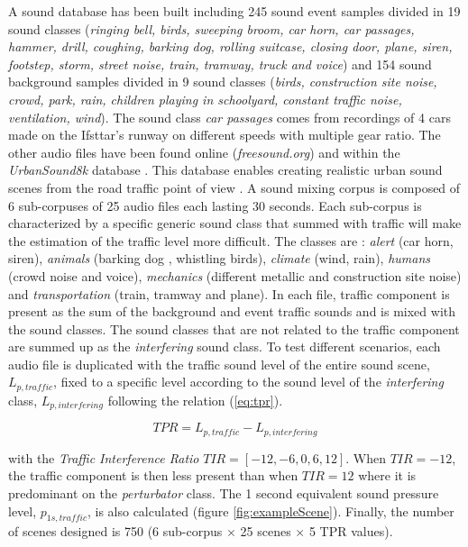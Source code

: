 \documentclass[twocolumn,a4paper,10pt]{article}
\begin{document}
A sound database has been built including 245 sound event samples divided in 19 sound classes (\textit{ringing bell, birds, sweeping broom, car horn, car passages, hammer, drill, coughing, barking dog, rolling suitcase, closing door, plane, siren, footstep, storm, street noise, train, tramway, truck and voice}) and 154 sound background samples divided in 9 sound classes (\textit{birds, construction site noise, crowd, park, rain, children playing in schoolyard, constant traffic noise, ventilation, wind}). The sound class \textit{car passages} comes from recordings of 4 cars made on the Ifsttar's runway on different speeds with multiple gear ratio. The other audio files have been found online (\textit{freesound.org}) and within the \textit{UrbanSound8k} database \cite{salamon_dataset_nodate}. This database enables creating realistic urban sound scenes from the road traffic point of view \cite{gloaguen_creation_2017}. A sound mixing corpus is composed of 6 sub-corpuses of 25 audio files each lasting 30 seconds. Each sub-corpus is characterized by a specific generic sound class that summed with traffic will make the estimation of the traffic level more difficult. The classes are : \textit{alert} (car horn, siren), \textit{animals} (barking dog , whistling birds), \textit{climate} (wind, rain), \textit{humans} (crowd noise and voice), \textit{mechanics} (different metallic and construction site noise) and \textit{transportation} (train, tramway and plane). In each file, traffic component is present as the sum of the background and event traffic sounds and is mixed with the sound classes. The sound classes that are not related to the traffic component are summed up as the \textit{interfering} sound class. To test different scenarios, each audio file is duplicated with the traffic sound level of the entire sound scene, $L_{p,traffic}$, fixed to a specific level according to the sound level of the \textit{interfering} class, $L_{p,interfering}$ following the relation (\ref{eq:tpr}).

\begin{equation}\label{eq:tpr}
TPR = L_{p,traffic}-L_{p,interfering}
\end{equation}

with the \textit{Traffic Interference Ratio} $TIR = \left[-12, -6, 0, 6, 12\right]$. When $TIR = -12$, the traffic component is then less present than when $TIR = 12$ where it is predominant on the \textit{perturbator} class. The 1 second equivalent sound pressure level, $p_{1s,traffic}$, is also calculated (figure \ref{fig:exampleScene}). Finally, the number of scenes designed is 750 (6 sub-corpus $\times$ 25 scenes $\times$  5 TPR values).
\end{document}
